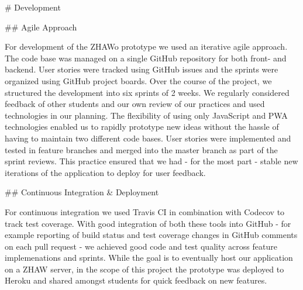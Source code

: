 \begin{markdown}

# Development

## Agile Approach

For development of the ZHAWo prototype we used an iterative agile approach. The code base was managed on a single GitHub repository \cite{DUMMY} for both front- and backend. User stories were tracked using GitHub issues and the sprints were organized using GitHub project boards. Over the course of the project, we structured the development into six sprints of 2 weeks. We regularly considered feedback of other students and our own review of our practices and used technologies in our planning. The flexibility of using only JavaScript and PWA technologies enabled us to rapidly prototype new ideas without the hassle of having to maintain two different code bases.
User stories were implemented and tested in feature branches and merged into the master branch as part of the sprint reviews. This practice ensured that we had - for the most part - stable new iterations of the application to deploy for user feedback.

## Continuous Integration \& Deployment

For continuous integration we used Travis CI \cite{DUMMY} in combination with Codecov \cite{DUMMY} to track test coverage. With good integration of both these tools into GitHub - for example reporting of build status and test coverage changes in GitHub comments on each pull request - we achieved good code and test quality across feature implemenations and sprints.
While the goal is to eventually host our application on a ZHAW server, in the scope of this project the prototype was deployed to Heroku \cite{DUMMY} and shared amongst students for quick feedback on new features.

\end{markdown}
